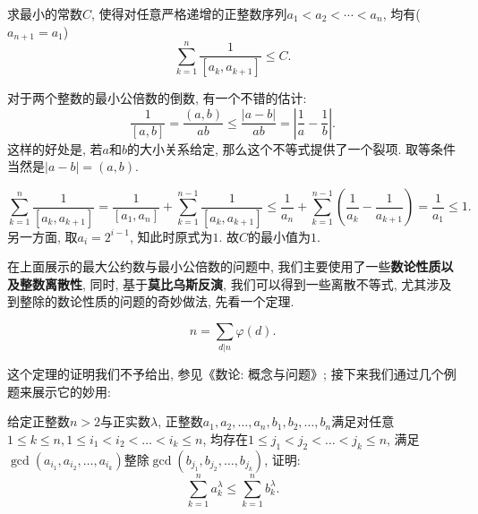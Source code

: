 \documentclass[lang=cn,12pt,thmcnt=section]{elegantbook}
\begin{document}
\begin{example}
求最小的常数$C$, 使得对任意严格递增的正整数序列$a_1<a_2<\cdots<a_n$, 均有($a_{n+1}=a_1$)
\[\sum_{k=1}^{n}\frac{1}{[a_{k},a_{k+1}]}\leq C.\]
\end{example}

\begin{analysis}
对于两个整数的最小公倍数的倒数, 有一个不错的估计:
\[\frac{1}{[a,b]}=\frac{(a,b)}{ab}\le\frac{|a-b|}{ab}=\left|\frac{1}{a}-\frac{1}{b}\right|.\]
这样的好处是, 若$a$和$b$的大小关系给定, 那么这个不等式提供了一个裂项. 取等条件当然是$|a-b|=(a,b)$.
\end{analysis}

\begin{solution}
\[\sum_{k=1}^{n}\frac{1}{[a_{k},a_{k+1}]}=\frac{1}{[a_1,a_n]}+\sum_{k=1}^{n-1}\frac{1}{[a_{k},a_{k+1}]}\le \frac{1}{a_n}+\sum_{k=1}^{n-1}\left(\frac{1}{a_k}-\frac{1}{a_{k+1}}\right)=\frac{1}{a_1}\le 1.\]
另一方面, 取$a_i=2^{i-1}$, 知此时原式为$1$. 故$C$的最小值为$1$.
\end{solution}

在上面展示的最大公约数与最小公倍数的问题中, 我们主要使用了一些\textbf{数论性质以及整数离散性}, 同时, 基于\textbf{莫比乌斯反演}, 我们可以得到一些离散不等式, 尤其涉及到整除的数论性质的问题的奇妙做法, 先看一个定理.

\begin{theorem}
\[n=\sum_{d|n}\varphi (d).\]
\end{theorem}

这个定理的证明我们不予给出, 参见《数论: 概念与问题》; 接下来我们通过几个例题来展示它的妙用: 

\begin{example}
给定正整数$n>2$与正实数$\lambda$, 正整数$a_1,a_2,\dots{},a_n,b_1,b_2,\dots{},b_n$满足对任意$1\le k\le n,1\le i_1<i_2<\dots{}<i_k\le n$, 均存在$1\le j_1<j_2<\dots{}<j_k\le n$, 满足$\gcd{(a_{i_1},a_{i_2},\dots{},a_{i_k})}$整除$\gcd{(b_{j_1},b_{j_2},\dots{},b_{j_k})}$, 证明: 
\[
\sum_{k=1}^n a_k^{\lambda}\le \sum_{k=1}^n b_k^{\lambda}.
\]
\end{example}
\end{document}
